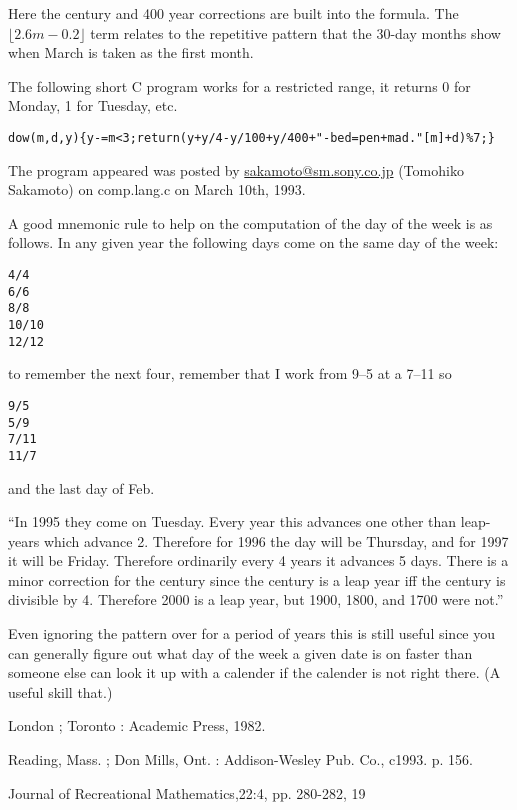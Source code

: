 Here the century and 400 year corrections are built into the formula.
The $\lfloor 2.6m-0.2\rfloor$ term relates to the repetitive pattern
that the 30-day months show when March is taken as the first month.

The following short C program works for a restricted range, it returns 0
for Monday, 1 for Tuesday, etc.

\begin{verbatim}
dow(m,d,y){y-=m<3;return(y+y/4-y/100+y/400+"-bed=pen+mad."[m]+d)%7;}
\end{verbatim}

The program appeared was posted by \url{sakamoto@sm.sony.co.jp}
(Tomohiko Sakamoto) on comp.lang.c on March 10th, 1993.

A good mnemonic rule to help on the computation of the day of the week
is as follows. In any given year the following days come on the same day
of the week:

\begin{verbatim}
4/4
6/6
8/8
10/10
12/12
\end{verbatim}

\noindent to remember the next four, remember that I work from 9--5 at a
7--11 so

\begin{verbatim}
9/5
5/9
7/11
11/7
\end{verbatim}

\noindent and the last day of Feb.

``In 1995 they come on Tuesday. Every year this advances one other than
leap-years which advance 2. Therefore for 1996 the day will be Thursday,
and for 1997 it will be Friday. Therefore ordinarily every 4 years it
advances 5 days. There is a minor correction for the century since the
century is a leap year iff the century is divisible by 4.  Therefore
2000 is a leap year, but 1900, 1800, and 1700 were not.''

Even ignoring the pattern over for a period of years this is still
useful since you can generally figure out what day of the week a given
date is on faster than someone else can look it up with a calender if
the calender is not right there. (A useful skill that.)

\Ref

 {London ; Toronto : Academic
  Press, 1982.}


{Reading, Mass. ; Don Mills, Ont. : Addison-Wesley Pub. Co.,
  c1993. p. 156.}

  {Journal of Recreational Mathematics,}{22:4, pp. 280-282,
  19}
